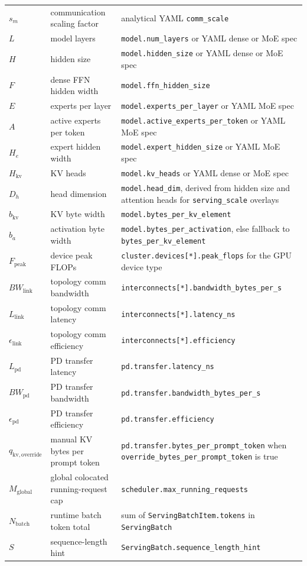 \begin{longtable}{p{} p{} p{}}
\(s_m\) & communication scaling factor & analytical YAML \texttt{comm\_scale} \\
\(L\) & model layers & \texttt{model.num\_layers} or YAML dense or MoE spec \\
\(H\) & hidden size & \texttt{model.hidden\_size} or YAML dense or MoE spec \\
\(F\) & dense FFN hidden width & \texttt{model.ffn\_hidden\_size} \\
\(E\) & experts per layer & \texttt{model.experts\_per\_layer} or YAML MoE spec \\
\(A\) & active experts per token & \texttt{model.active\_experts\_per\_token} or YAML MoE spec \\
\(H_e\) & expert hidden width & \texttt{model.expert\_hidden\_size} or YAML MoE spec \\
\(H_{\mathrm{kv}}\) & KV heads & \texttt{model.kv\_heads} or YAML dense or MoE spec \\
\(D_h\) & head dimension & \texttt{model.head\_dim}, derived from hidden size and attention heads for \texttt{serving\_scale} overlays \\
\(b_{\mathrm{kv}}\) & KV byte width & \texttt{model.bytes\_per\_kv\_element} \\
\(b_a\) & activation byte width & \texttt{model.bytes\_per\_activation}, else fallback to \texttt{bytes\_per\_kv\_element} \\
\(F_{\mathrm{peak}}\) & device peak FLOPs & \texttt{cluster.devices[*].peak\_flops} for the GPU device type \\
\(BW_{\mathrm{link}}\) & topology comm bandwidth & \texttt{interconnects[*].bandwidth\_bytes\_per\_s} \\
\(L_{\mathrm{link}}\) & topology comm latency & \texttt{interconnects[*].latency\_ns} \\
\(\epsilon_{\mathrm{link}}\) & topology comm efficiency & \texttt{interconnects[*].efficiency} \\
\(L_{\mathrm{pd}}\) & PD transfer latency & \texttt{pd.transfer.latency\_ns} \\
\(BW_{\mathrm{pd}}\) & PD transfer bandwidth & \texttt{pd.transfer.bandwidth\_bytes\_per\_s} \\
\(\epsilon_{\mathrm{pd}}\) & PD transfer efficiency & \texttt{pd.transfer.efficiency} \\
\(q_{\mathrm{kv,override}}\) & manual KV bytes per prompt token & \texttt{pd.transfer.bytes\_per\_prompt\_token} when \texttt{override\_bytes\_per\_prompt\_token} is true \\
\(M_{\mathrm{global}}\) & global colocated running-request cap & \texttt{scheduler.max\_running\_requests} \\
\(N_{\mathrm{batch}}\) & runtime batch token total & sum of \texttt{ServingBatchItem.tokens} in \texttt{ServingBatch} \\
\(S\) & sequence-length hint & \texttt{ServingBatch.sequence\_length\_hint} \\
\bottomrule
\end{longtable}

